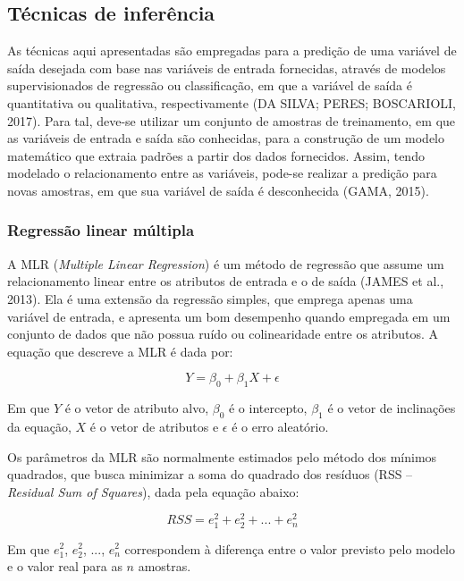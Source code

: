 \subsection{Técnicas de inferência}

As técnicas aqui apresentadas são empregadas para a predição de uma variável de saída desejada com base nas variáveis de entrada fornecidas, através de modelos supervisionados de regressão ou classificação, em que a variável de saída é quantitativa ou qualitativa, respectivamente (DA SILVA; PERES; BOSCARIOLI, 2017). Para tal, deve-se utilizar um conjunto de amostras de treinamento, em que as variáveis de entrada e saída são conhecidas, para a construção de um modelo matemático que extraia padrões a partir dos dados fornecidos. Assim, tendo modelado o relacionamento entre as variáveis, pode-se realizar a predição para novas amostras, em que sua variável de saída é desconhecida (GAMA, 2015).

\subsubsection{Regressão linear múltipla}

A MLR (\textit{Multiple Linear Regression}) é um método de regressão que assume um relacionamento linear entre os atributos de entrada e o de saída (JAMES et al., 2013). Ela é uma extensão da regressão simples, que emprega apenas uma variável de entrada, e apresenta um bom desempenho quando empregada em um conjunto de dados que não possua ruído ou colinearidade entre os atributos. A equação que descreve a MLR é dada por:

\begin{equation} \label{eq:mlr}
	Y = \beta_0 + \beta_1 X + \epsilon
\end{equation}

Em que $Y$ é o vetor de atributo alvo, $\beta_0$ é o intercepto, $\beta_1$ é o vetor de inclinações da equação, $X$ é o vetor de atributos e $\epsilon$ é o erro aleatório. 

Os parâmetros da MLR são normalmente estimados pelo método dos mínimos quadrados, que busca minimizar a soma do quadrado dos resíduos (RSS – \textit{Residual Sum of Squares}), dada pela equação abaixo:

\begin{equation} \label{eq:rss}
	RSS = e_1^2 + e_2^2 + ... + e_n^2
\end{equation}

Em que $e_1^2$, $e_2^2$, ..., $e_n^2$ correspondem à diferença entre o valor previsto pelo modelo e o valor real para as $n$ amostras. 


